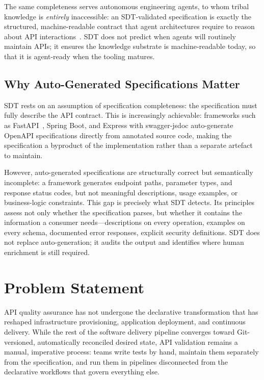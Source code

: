 The same completeness serves autonomous engineering agents, to whom tribal knowledge is \textit{entirely} inaccessible: an SDT-validated specification is exactly the structured, machine-readable contract that agent architectures require to reason about API interactions~\cite{swe-agent}. SDT does not predict when agents will routinely maintain APIs; it ensures the knowledge substrate is machine-readable today, so that it is agent-ready when the tooling matures.

\subsection{Why Auto-Generated Specifications Matter}
\label{subsec:autogen-specs}

SDT rests on an assumption of specification completeness: the specification must fully describe the API contract. This is increasingly achievable: frameworks such as FastAPI~\cite{fastapi}, Spring Boot, and Express with swagger-jsdoc auto-generate OpenAPI specifications directly from annotated source code, making the specification a byproduct of the implementation rather than a separate artefact to maintain.

However, auto-generated specifications are structurally correct but semantically incomplete: a framework generates endpoint paths, parameter types, and response status codes, but not meaningful descriptions, usage examples, or business-logic constraints. This gap is precisely what SDT detects. Its principles assess not only whether the specification parses, but whether it contains the information a consumer needs---descriptions on every operation, examples on every schema, documented error responses, explicit security definitions. SDT does not replace auto-generation; it audits the output and identifies where human enrichment is still required.

\section{Problem Statement}
\label{sec:problem-statement}

API quality assurance has not undergone the declarative transformation that has reshaped infrastructure provisioning, application deployment, and continuous delivery. While the rest of the software delivery pipeline converges toward Git-versioned, automatically reconciled desired state, API validation remains a manual, imperative process: teams write tests by hand, maintain them separately from the specification, and run them in pipelines disconnected from the declarative workflows that govern everything else.

